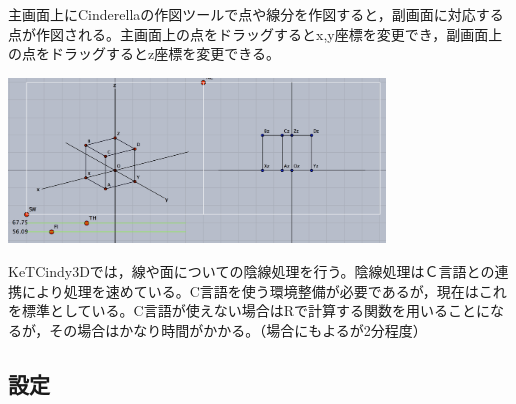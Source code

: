 \documentclass[papersize,a4paper,12pt,uplatex]{jsarticle}
\begin{document}
主画面上にCinderellaの作図ツールで点や線分を作図すると，副画面に対応する点が作図される。主画面上の点をドラッグするとx,y座標を変更でき，副画面上の点をドラッグするとz座標を変更できる。

\vspace{\baselineskip}
\begin{center}
 \includegraphics[bb=0.00 0.00 863.04 378.52 , width=10cm]{Fig/3dscreen.pdf}
\end{center}

KeTCindy3Dでは，線や面についての陰線処理を行う。陰線処理はＣ言語との連携により処理を速めている。C言語を使う環境整備が必要であるが，現在はこれを標準としている。C言語が使えない場合はRで計算する関数を用いることになるが，その場合はかなり時間がかかる。（場合にもよるが2分程度）

\newpage
\subsection{設定}
\end{document}
